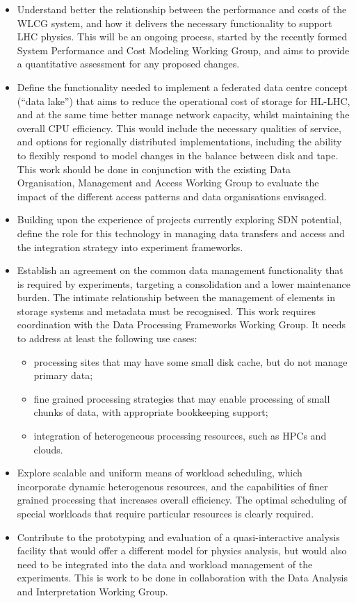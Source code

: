\begin{itemize}
\item
  Understand better the relationship between the performance and costs
  of the WLCG system, and how it delivers the necessary functionality to
  support LHC physics. This will be an ongoing process, started by the
  recently formed System Performance and Cost Modeling Working Group,
  and aims to provide a quantitative assessment for any proposed
  changes.
\item
  Define the functionality needed to implement a federated data centre
  concept (``data lake'') that aims to reduce the operational cost of
  storage for HL-LHC, and at the same time better manage network
  capacity, whilst maintaining the overall CPU efficiency. This would
  include the necessary qualities of service, and options for regionally
  distributed implementations, including the ability to flexibly respond
  to model changes in the balance between disk and tape. This work
  should be done in conjunction with the existing Data Organisation,
  Management and Access Working Group to evaluate the impact of the
  different access patterns and data organisations envisaged.
\item
  Building upon the experience of projects currently exploring SDN
  potential, define the role for this technology in managing data transfers and
  access and the integration strategy into experiment frameworks.
\item
  Establish an agreement on the common data management functionality
  that is required by experiments, targeting a consolidation and a lower
  maintenance burden. The intimate relationship between the management
  of elements in storage systems and metadata must be recognised. This
  work requires coordination with the Data Processing Frameworks
  Working Group. It
  needs to address at least the following use cases:

  \begin{itemize}
  \item
    processing sites that may have some small disk cache, but do not
    manage primary data;
  \item
    fine grained processing strategies that may enable processing of
    small chunks of data, with appropriate bookkeeping support;
  \item
    integration of heterogeneous processing resources, such as HPCs and
    clou\-ds.
  \end{itemize}
\item
  Explore scalable and uniform means of workload scheduling, which
  incorporate dynamic heterogenous resources, and the capabilities of
  finer grained processing that increases overall efficiency. The
  optimal scheduling of special workloads that require particular
  resources is clearly required.
\item
  Contribute to the prototyping and evaluation of a quasi-interactive
  analysis facility that would offer a different model for physics
  analysis, but would also need to be integrated into the data and
  workload management of the experiments. This is work to be done in
  collaboration with the Data Analysis and Interpretation Working Group.
\end{itemize}


